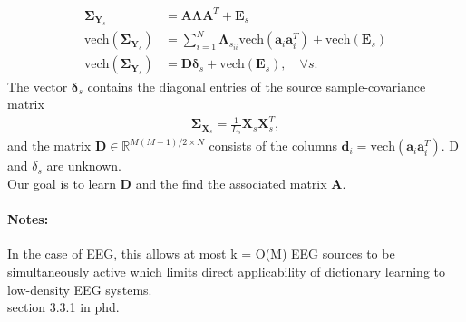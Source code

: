 \begin{align*}
\boldsymbol{\Sigma}_{\mathbf{Y}_s} &= \mathbf{A} \boldsymbol{\Lambda} \mathbf{A}^T + \mathbf{E}_s \\
\text{vech}(\boldsymbol{\Sigma}_{\mathbf{Y}_s}) &= \sum_{i=1}^N \boldsymbol{\Lambda}_{s_{ii}} \text{vech}(\mathbf{a}_i \mathbf{a}_i^T) + \text{vech}(\mathbf{E}_s) \\
\text{vech}(\boldsymbol{\Sigma}_{\mathbf{Y}_s}) &= \mathbf{D} \boldsymbol{\delta}_s + \text{vech}(\mathbf{E}_s), \quad \forall s.
\end{align*}
The vector $\boldsymbol{\delta}_s$ contains the diagonal entries of the source sample-covariance matrix
\begin{align*}
\boldsymbol{\Sigma}_{\mathbf{X}_s} = \frac{1}{L_s} \mathbf{X}_s \mathbf{X}_s^T,
\end{align*}
and the matrix $\mathbf{D} \in \mathbb{R}^{M(M+1)/2 \times N}$ consists of the columns $\mathbf{d}_i = \text{vech}(\mathbf{a}_i \mathbf{a}_i^T)$. D and $\delta_s$ are unknown.
\\
Our goal is to learn $\mathbf{D}$ and the find the associated matrix $\mathbf{A}$.


\paragraph{Notes:}
In the case of EEG, this allows at most k = O(M) EEG sources to be simultaneously active which limits direct applicability of dictionary learning to low-density EEG systems.
\\
section 3.3.1 in phd.
















